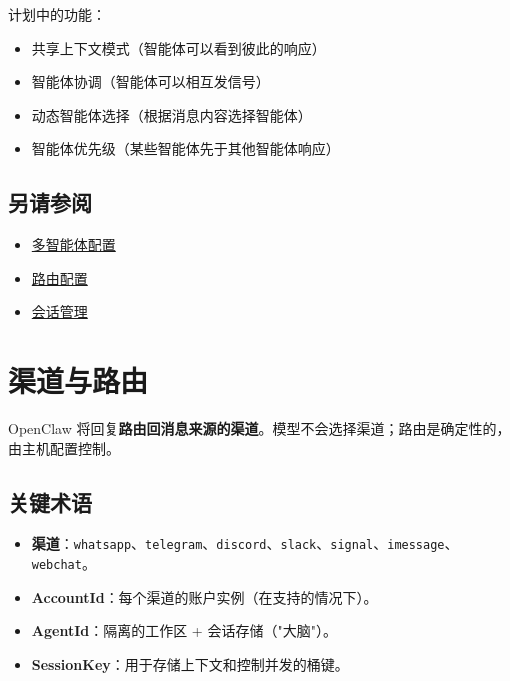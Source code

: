 计划中的功能：

\begin{itemize}
  \item [ ] 共享上下文模式（智能体可以看到彼此的响应）
  \item [ ] 智能体协调（智能体可以相互发信号）
  \item [ ] 动态智能体选择（根据消息内容选择智能体）
  \item [ ] 智能体优先级（某些智能体先于其他智能体响应）
\end{itemize}


\subsection{另请参阅}


\begin{itemize}
  \item \href{/tools/multi-agent-sandbox-tools}{多智能体配置}
  \item \href{/channels/channel-routing}{路由配置}
  \item \href{/concepts/session}{会话管理}
\end{itemize}



\clearpage

\section{渠道与路由}


OpenClaw 将回复\textbf{路由回消息来源的渠道}。模型不会选择渠道；路由是确定性的，由主机配置控制。

\subsection{关键术语}


\begin{itemize}
  \item \textbf{渠道}：\texttt{whatsapp}、\texttt{telegram}、\texttt{discord}、\texttt{slack}、\texttt{signal}、\texttt{imessage}、\texttt{webchat}。
  \item \textbf{AccountId}：每个渠道的账户实例（在支持的情况下）。
  \item \textbf{AgentId}：隔离的工作区 + 会话存储（"大脑"）。
  \item \textbf{SessionKey}：用于存储上下文和控制并发的桶键。
\end{itemize}


